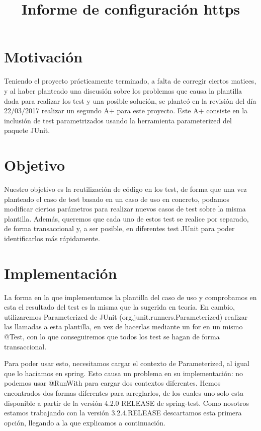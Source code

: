 \documentclass[a4paper]{article}
\title{Informe de configuración https}
\date{}
\begin{document}
\setlength{\voffset}{-5em}
\maketitle

\section{Motivación}

Teniendo el proyecto prácticamente terminado, a falta de corregir ciertos matices, y al haber planteado una discusión sobre los problemas que causa la plantilla dada para realizar los test y una posible solución, se planteó en la revisión del día 22/03/2017 realizar un segundo A+ para este proyecto. Este A+ consiste en la inclusión de test parametrizados usando la herramienta parameterized del paquete JUnit.

\section{Objetivo}

Nuestro objetivo es la reutilización de código en los test, de forma que una vez planteado el caso de test basado en un caso de uso en concreto, podamos modificar ciertos parámetros para realizar nuevos casos de test sobre la misma plantilla. Además, queremos que cada uno de estos test se realice por separado, de forma transaccional y, a ser posible, en diferentes test JUnit para poder identificarlos más rápidamente.

\section{Implementación}

La forma en la que implementamos la plantilla del caso de uso y comprobamos en esta el resultado del test es la misma que la sugerida en teoría. En cambio, utilizaremos Parameterized de JUnit (org.junit.runners.Parameterized) realizar las llamadas a esta plantilla, en vez de hacerlas mediante un for en un mismo @Test, con lo que conseguiremos que todos los test se hagan de forma transaccional. 

Para poder usar esto, necesitamos cargar el contexto de Parameterized, al igual que lo haciamos en spring. Esto causa un problema en su implementación: no podemos usar @RunWith para cargar dos contextos diferentes. Hemos encontrados dos formas diferentes para arreglarlos, de los cuales uno solo esta disponible a partir de la versión 4.2.0 RELEASE de spring-test. Como nosotros estamos trabajando con la versión 3.2.4.RELEASE descartamos esta primera opción, llegando a la que explicamos a continuación.
\end{document}
